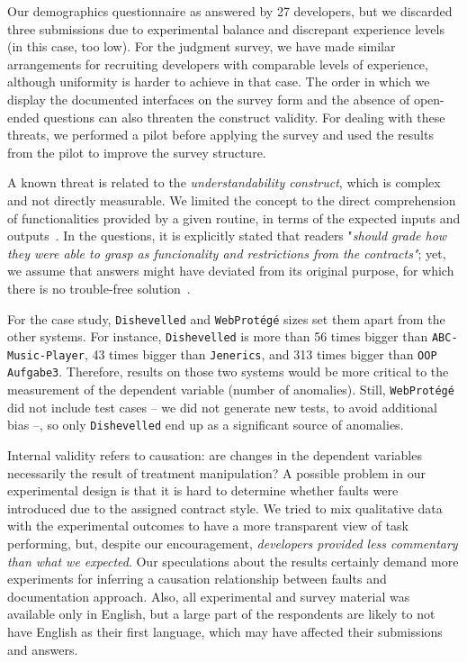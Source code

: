 Our demographics questionnaire as answered by 27 developers, but we discarded three submissions due to experimental balance and discrepant experience levels (in this case, too low).
For the judgment survey, we have made similar arrangements for recruiting developers with comparable levels of experience, although uniformity is harder to achieve in that case.
The order in which we display the documented
interfaces on the survey form and the absence of open-ended questions can also threaten the construct validity. For dealing with these threats, we
performed a pilot before applying the survey and used the results from the pilot to improve the survey structure. 


A known threat is related to the \emph{understandability construct}, which is complex and not directly measurable. We limited the concept to the direct comprehension of functionalities provided by a given routine, in terms of the expected inputs and outputs~\cite{4019969}. In the questions, it is explicitly stated that readers "\emph{should grade how they were able to grasp as funcionality and restrictions from the contracts"}; yet, we assume that answers might have deviated from its original purpose, for which there is no trouble-free solution~\cite{Scalabrino2017}.



For the case study, \texttt{Dishevelled} and
\texttt{WebProt\'{e}g\'{e}} sizes set them apart from the other systems.
For instance, \texttt{Dishevelled} is more than 56 times bigger than \texttt{ABC-Music-Player}, 43
times bigger than \texttt{Jenerics}, and 313 times bigger than \texttt{OOP Aufgabe3}.
Therefore, results on those two systems would be more critical to the measurement of the dependent variable (number of anomalies).
Still, \texttt{WebProt\'{e}g\'{e}} did not include test cases -- we did not generate new tests, to avoid additional bias --, so only \texttt{Dishevelled} end up as a significant source of anomalies.


Internal validity refers to causation: are changes in the dependent variables necessarily the result of treatment manipulation? A possible problem in our experimental design is that it is hard to determine whether faults were introduced due to the assigned contract style. We tried to mix qualitative data with the experimental outcomes to have a more transparent view of task performing, but, despite our encouragement, \emph{developers provided less commentary than what we expected}. Our speculations about the results certainly demand more experiments for inferring a causation relationship between faults and documentation approach.
Also, all experimental and survey material was available only in English, but a large part of the respondents are likely to not have English as their first language, which may have affected their
submissions and answers.

